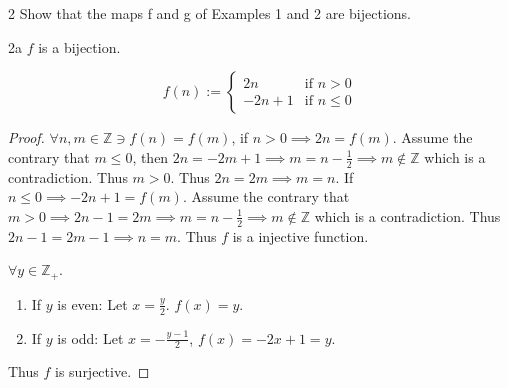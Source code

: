 \documentclass{article}
\newcommand{\Z}{\mathbb{Z}}
\begin{document}
\begin{PROB}{2}\label{Problem 2.}
    Show that the maps f and g of Examples 1 and 2 are bijections.
\end{PROB}
\begin{claim}{2a}\label{Claim 2a.}
    $f$ is a bijection. 

    \begin{equation*}
        f(n) := \begin{cases*}
            2n & \text{if $n > 0$} \\
            -2n + 1 & \text{if $n \leq 0$}
        \end{cases*}
    \end{equation*} 
\end{claim}
\begin{proof}
    $\forall n, m \in \Z \ni f(n) = f(m)$, if $n > 0 \implies 2n = f(m)$. Assume the contrary that $m \leq 0$, then $2n = -2m + 1 \implies m = n - \frac{1}{2} \implies m \not \in \Z$ which is a contradiction. Thus $m > 0$. Thus $2n = 2m \implies m = n$. If $n \leq 0 \implies -2n + 1 = f(m)$. Assume the contrary that $m > 0 \implies 2n - 1 =2m \implies m = n - \frac{1}{2} \implies m \not \in \Z$ which is a contradiction. Thus $2n - 1 = 2m - 1 \implies n = m$. Thus $f$ is a injective function. 
    
    $\forall y \in \Z_+$. 
    
    \begin{enumerate}
        \item If $y$ is even: Let $x = \frac{y}{2}$. $f(x) = y$.
        \item If $y$ is odd: Let $x = -\frac{y - 1}{2}$, $f(x) = -2x + 1 = y$.     
    \end{enumerate}

    Thus $f$ is surjective. 
\end{proof}
    

\end{document}

